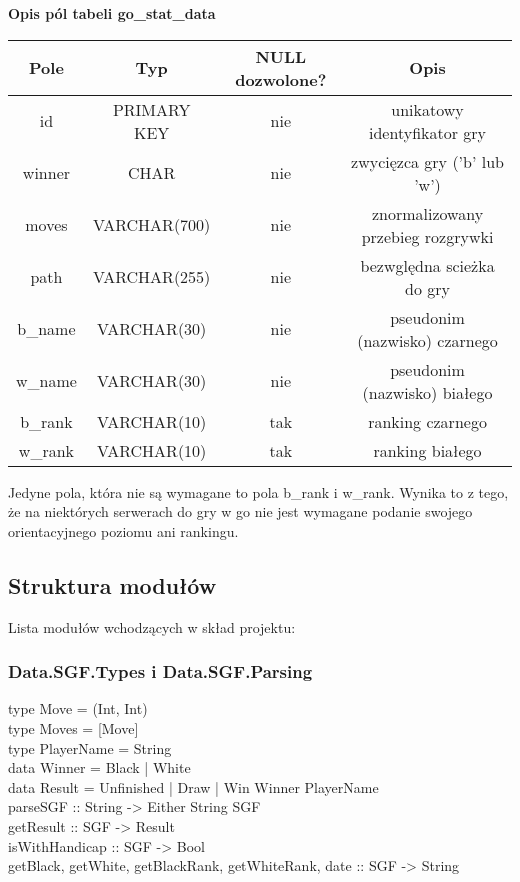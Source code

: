 \documentclass[10pt,leqno]{article}
\begin{document}
\begin{center}
\textbf{Opis pól tabeli go\_stat\_data}
\renewcommand{\arraystretch}{1.5}
\begin{tabular}{| c | c | c | c | } \hline
 Pole    & Typ          & NULL dozwolone? & Opis                  \\ \hline
 id      & PRIMARY KEY  & nie & unikatowy identyfikator gry       \\ \hline
 winner  & CHAR         & nie & zwycięzca gry ('b' lub 'w')       \\ \hline
 moves   & VARCHAR(700) & nie & znormalizowany przebieg rozgrywki \\ \hline
 path    & VARCHAR(255) & nie & bezwględna scieżka do gry         \\ \hline
 b\_name & VARCHAR(30)  & nie & pseudonim (nazwisko) czarnego     \\ \hline
 w\_name & VARCHAR(30)  & nie & pseudonim (nazwisko) białego      \\ \hline
 b\_rank & VARCHAR(10)  & tak & ranking czarnego                  \\ \hline
 w\_rank & VARCHAR(10)  & tak & ranking białego                   \\ \hline
\end{tabular}

\end{center}

Jedyne pola, która nie są wymagane to pola b\_rank i w\_rank. Wynika to z tego, że na niektórych serwerach do gry w go
nie jest wymagane podanie swojego orientacyjnego poziomu ani rankingu. 

\subsection{Struktura modułów}
Lista modułów wchodzących w skład projektu:

\subsubsection{Data.SGF.Types i Data.SGF.Parsing}

\begin{framed}
\noindent type Move  = (Int, Int) \\
type Moves = [Move] \\
type PlayerName = String \\ 
data Winner     = Black | White \\
data Result = Unfinished | Draw | Win Winner PlayerName \\

\noindent parseSGF :: String -> Either String SGF \\
getResult :: SGF -> Result \\
isWithHandicap :: SGF -> Bool \\
getBlack, getWhite, getBlackRank, getWhiteRank, date :: SGF -> String
\end{framed}
\end{document}
